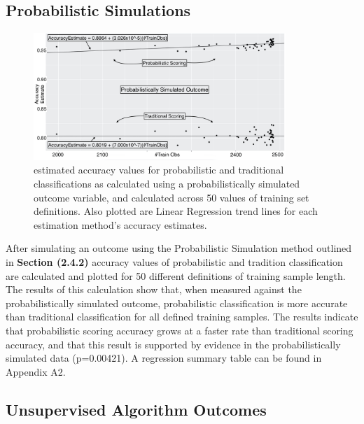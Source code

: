 \documentclass[12pt,]{article}
\begin{document}
\newpage

\hypertarget{probabilistic-simulations}{%
\subsection{Probabilistic Simulations}\label{probabilistic-simulations}}

\begin{figure}[h!]
\begin{center}
\includegraphics[width=0.85\textwidth]{Sup2Graph.jpg}
\end{center}
\caption[Probabilistic Simulations Result Plot]{estimated accuracy values for probabilistic and traditional classifications as calculated using a probabilistically simulated outcome variable, and calculated across 50 values of training set definitions.  Also plotted are Linear Regression trend lines for each estimation method's accuracy estimates.}
\end{figure}

After simulating an outcome using the Probabilistic Simulation method
outlined in \textbf{Section (2.4.2)} accuracy values of probabilistic
and tradition classification are calculated and plotted for 50 different
definitions of training sample length. The results of this calculation
show that, when measured against the probabilistically simulated
outcome, probabilistic classification is more accurate than traditional
classification for all defined training samples. The results indicate
that probabilistic scoring accuracy grows at a faster rate than
traditional scoring accuracy, and that this result is supported by
evidence in the probabilistically simulated data (p=0.00421). A
regression summary table can be found in Appendix A2.

\newpage

\hypertarget{unsupervised-algorithm-outcomes}{%
\subsection{Unsupervised Algorithm
Outcomes}\label{unsupervised-algorithm-outcomes}}
\end{document}
